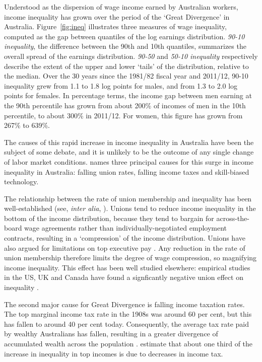 Understood as the dispersion of wage income earned by Australian workers, income inequality has grown over the period of the `Great Divergence' in Australia. Figure~\ref{fig:ineq} illustrates three measures of wage inequality, computed as the gap between quantiles of the log earnings distribution. {\em 90-10 inequality}, the difference between the 90th and 10th quantiles, summarizes the overall spread of the earnings distribution. {\em 90-50} and {\em 50-10 inequality} respectively describe the extent of the upper and lower `tails' of the distribution, relative to the median. Over the 30 years since the 1981/82 fiscal year and 2011/12, 90-10 inequality grew from 1.1 to 1.8 log points for males, and from 1.3 to 2.0 log points for females. In percentage terms, the income gap between men earning at the 90th percentile has grown from about 200\% of incomes of men in the 10th percentile, to about 300\% in 2011/12. For women, this figure has grown from 267\% to 639\%.


The causes of this rapid increase in income inequality in Australia have been the subject of some debate, and it is unlikely to be the outcome of any single change of labor market conditions. \citet{Leigh2013} names three principal causes for this surge in income inequality in Australia: falling union rates, falling income taxes and skill-biased technology. 

The relationship between the rate of union membership and inequality has been well-established (see, {\em inter alia}, \cite{Borland1996}).  Unions tend to reduce income inequality in the bottom of the income distribution, because they tend to bargain for across-the-board wage agreements rather than individually-negotiated employment contracts, resulting in a `compression' of the income distribution. Unions have also argued for limitations on top executive pay \citep{Davis2009}. Any reduction in the rate of union membership therefore limits the degree of wage compression, so magnifying income inequality. This effect has been well studied elsewhere: empirical studies in the US, UK and Canada have found a signficantly negative union effect on inequality \citet{Card2004,Firpo2009}. 

The second major cause for Great Divergence is falling income taxation rates. The top marginal income tax rate in the 1908s was around 60 per cent, but this has fallen to around 40 per cent today. Consequently, the average tax rate paid by wealthy Australians has fallen, resulting in a greater divergence of accumulated wealth across the population \citet[p31]{Leigh2013}. \citet{Atkinson2013} estimate that about one third of the increase in inequality in top incomes is due to decreases in income tax.

